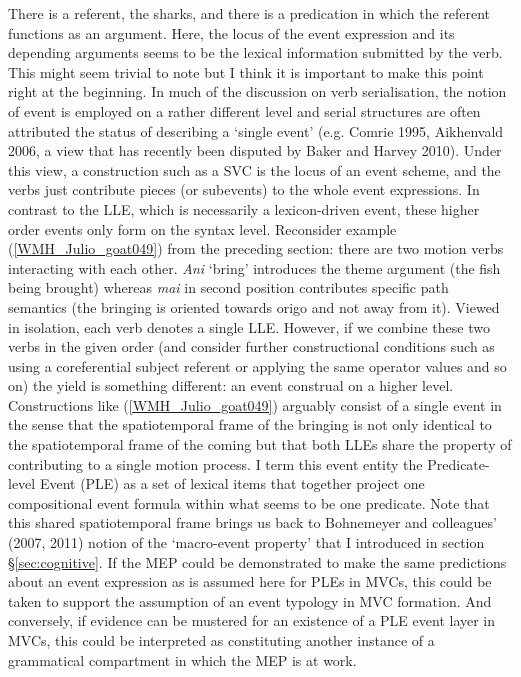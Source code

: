 There is a referent, the sharks, and there is a predication in which the referent functions as an argument. Here, the locus of the event expression and its depending arguments seems to be the lexical information submitted by the verb. This might seem trivial to note but I think it is important to make this point right at the beginning. In much of the discussion on verb serialisation, the notion of event is employed on a rather different level and serial structures are often attributed the status of describing a `single event' (e.g. Comrie 1995, Aikhenvald 2006, a view that has recently been disputed by Baker and Harvey 2010). Under this view, a construction such as a SVC is the locus of an event scheme, and the verbs just contribute pieces (or subevents) to the whole event expressions. In contrast to the LLE, which is necessarily a lexicon-driven event, these higher order events only form on the syntax level. Reconsider example (\ref{WMH_Julio_goat049}) from the preceding section: there are two motion verbs interacting with each other. \textit{Ani} `bring' introduces the theme argument (the fish being brought) whereas \textit{mai} in second position contributes specific path semantics (the bringing is oriented towards origo and not away from it). Viewed in isolation, each verb denotes a single LLE. However, if we combine these two verbs in the given order (and consider further constructional conditions such as using a coreferential subject referent or applying the same operator values and so on) the yield is something different: an event construal on a higher level. Constructions like (\ref{WMH_Julio_goat049}) arguably consist of a single event in the sense that the spatiotemporal frame of the bringing is not only identical to the spatiotemporal frame of the coming but that both LLEs share the property of contributing to a single motion process. I term this event entity the Predicate-level Event (PLE) as a set of lexical items that together project one compositional event formula within what seems to be one predicate. Note that this shared spatiotemporal frame brings us back to Bohnemeyer and colleagues' (2007, 2011) notion of the `macro-event property' that I introduced in section §\ref{sec:cognitive}. If the MEP could be demonstrated to make the same predictions about an event expression as is assumed here for PLEs in MVCs, this could be taken to support the assumption of an event typology in MVC formation. And conversely, if evidence can be mustered for an existence of a PLE event layer in MVCs, this could be interpreted as constituting another instance of a grammatical compartment in which the MEP is at work.

